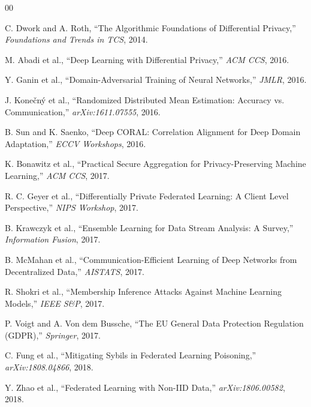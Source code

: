 \documentclass[conference]{IEEEtran}
\begin{document}
\begin{thebibliography}{00}

 C. Dwork and A. Roth, ``The Algorithmic Foundations of Differential Privacy,'' \textit{Foundations and Trends in TCS}, 2014.

 M. Abadi et al., ``Deep Learning with Differential Privacy,'' \textit{ACM CCS}, 2016.

 Y. Ganin et al., ``Domain-Adversarial Training of Neural Networks,'' \textit{JMLR}, 2016.

 J. Kone\v{c}n\'y et al., ``Randomized Distributed Mean Estimation: Accuracy vs. Communication,'' \textit{arXiv:1611.07555}, 2016.

 B. Sun and K. Saenko, ``Deep CORAL: Correlation Alignment for Deep Domain Adaptation,'' \textit{ECCV Workshops}, 2016.

 K. Bonawitz et al., ``Practical Secure Aggregation for Privacy-Preserving Machine Learning,'' \textit{ACM CCS}, 2017.

 R. C. Geyer et al., ``Differentially Private Federated Learning: A Client Level Perspective,'' \textit{NIPS Workshop}, 2017.

 B. Krawczyk et al., ``Ensemble Learning for Data Stream Analysis: A Survey,'' \textit{Information Fusion}, 2017.


 B. McMahan et al., ``Communication-Efficient Learning of Deep Networks from Decentralized Data,'' \textit{AISTATS}, 2017.

 R. Shokri et al., ``Membership Inference Attacks Against Machine Learning Models,'' \textit{IEEE S\&P}, 2017.

 P. Voigt and A. Von dem Bussche, ``The EU General Data Protection Regulation (GDPR),'' \textit{Springer}, 2017.

 C. Fung et al., ``Mitigating Sybils in Federated Learning Poisoning,'' \textit{arXiv:1808.04866}, 2018.

 Y. Zhao et al., ``Federated Learning with Non-IID Data,'' \textit{arXiv:1806.00582}, 2018.


\end{thebibliography}
\end{document}
